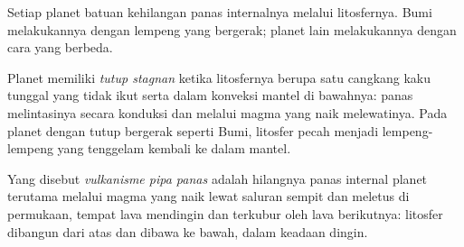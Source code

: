 Setiap planet batuan kehilangan panas internalnya melalui litosfernya.
Bumi melakukannya dengan lempeng yang bergerak; planet lain melakukannya dengan cara yang berbeda.

\begin{definition}\label{def:b3:planetary-interiors-surfaces:stagnant-lid}
Planet memiliki \emph{tutup stagnan} ketika litosfernya
berupa satu cangkang kaku tunggal yang tidak ikut serta dalam konveksi
mantel di bawahnya: panas melintasinya secara konduksi dan melalui magma yang naik
melewatinya. Pada planet dengan tutup bergerak seperti Bumi, litosfer
pecah menjadi lempeng-lempeng yang tenggelam kembali ke dalam mantel.
\end{definition}

\begin{definition}\label{def:b3:planetary-interiors-surfaces:heat-pipe}
Yang disebut \emph{vulkanisme pipa panas} adalah hilangnya
panas internal planet terutama melalui magma yang naik lewat saluran sempit dan
meletus di permukaan, tempat lava mendingin dan terkubur oleh lava
berikutnya: litosfer dibangun dari atas dan dibawa ke bawah, dalam keadaan dingin.
\end{definition}

